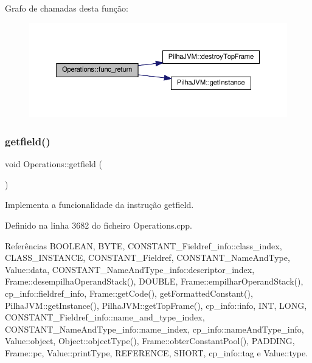 Grafo de chamadas desta função\+:\nopagebreak
\begin{figure}[H]
\begin{center}
\leavevmode
\includegraphics[width=350pt]{classOperations_aa33b77fb62f7e76c347503c97c6b080b_cgraph}
\end{center}
\end{figure}
\mbox{\label{classOperations_a0bb399fe0f64dc21699132c092560e19}} 
\subsubsection{\texorpdfstring{getfield()}{getfield()}}
{\footnotesize\ttfamily void Operations\+::getfield (\begin{DoxyParamCaption}{ }\end{DoxyParamCaption})\hspace{0.3cm}{\ttfamily [private]}}



Implementa a funcionalidade da instrução getfield. 



Definido na linha 3682 do ficheiro Operations.\+cpp.



Referências B\+O\+O\+L\+E\+AN, B\+Y\+TE, C\+O\+N\+S\+T\+A\+N\+T\+\_\+\+Fieldref\+\_\+info\+::class\+\_\+index, C\+L\+A\+S\+S\+\_\+\+I\+N\+S\+T\+A\+N\+CE, C\+O\+N\+S\+T\+A\+N\+T\+\_\+\+Fieldref, C\+O\+N\+S\+T\+A\+N\+T\+\_\+\+Name\+And\+Type, Value\+::data, C\+O\+N\+S\+T\+A\+N\+T\+\_\+\+Name\+And\+Type\+\_\+info\+::descriptor\+\_\+index, Frame\+::desempilha\+Operand\+Stack(), D\+O\+U\+B\+LE, Frame\+::empilhar\+Operand\+Stack(), cp\+\_\+info\+::fieldref\+\_\+info, Frame\+::get\+Code(), get\+Formatted\+Constant(), Pilha\+J\+V\+M\+::get\+Instance(), Pilha\+J\+V\+M\+::get\+Top\+Frame(), cp\+\_\+info\+::info, I\+NT, L\+O\+NG, C\+O\+N\+S\+T\+A\+N\+T\+\_\+\+Fieldref\+\_\+info\+::name\+\_\+and\+\_\+type\+\_\+index, C\+O\+N\+S\+T\+A\+N\+T\+\_\+\+Name\+And\+Type\+\_\+info\+::name\+\_\+index, cp\+\_\+info\+::name\+And\+Type\+\_\+info, Value\+::object, Object\+::object\+Type(), Frame\+::obter\+Constant\+Pool(), P\+A\+D\+D\+I\+NG, Frame\+::pc, Value\+::print\+Type, R\+E\+F\+E\+R\+E\+N\+CE, S\+H\+O\+RT, cp\+\_\+info\+::tag e Value\+::type.




